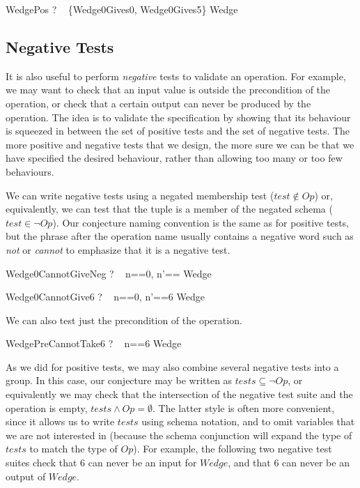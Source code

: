 \documentclass{llncs}
\begin{document}
\begin{theorem}{WedgePos}
  \vdash? ~ \{Wedge0Gives0, Wedge0Gives5\} \subseteq Wedge
\end{theorem}


\subsection{Negative Tests}

It is also useful to perform \emph{negative} tests to validate an
operation.  For example, we may want to check that an input value is
outside the precondition of the operation, or check that a certain output
can never be produced by the operation.  The idea is to validate the
specification by showing that its behaviour is squeezed in between the set
of positive tests and the set of negative tests.  The more positive and
negative tests that we design, the more sure we can be that we have
specified the desired behaviour, rather than allowing too many or too few
behaviours.

We can write negative tests using a negated membership test ($test
\notin Op$) or, equivalently, we can test that the tuple is a member
of the negated schema ($test \in \lnot Op$).  Our conjecture naming
convention is the same as for positive tests, but the phrase after the
operation name usually contains a negative word such as \emph{not} or
\emph{cannot} to emphasize that it is a negative test.

\begin{theorem}{Wedge0CannotGiveNeg}
  \vdash? ~ \lblot n==0, n'== \rblot \notin Wedge
\end{theorem}
\vspace{-5ex}
\begin{theorem}{Wedge0CannotGive6}
  \vdash? ~ \lblot n==0, n'==6 \rblot \in \lnot Wedge
\end{theorem}

We can also test just the precondition of the operation.
\begin{theorem}{WedgePreCannotTake6}
  \vdash? ~ \lblot n==6 \rblot \notin \pre Wedge
\end{theorem}

As we did for positive tests, we may also combine several negative tests
into a group.  In this case, our conjecture may be written as $tests
\subseteq \lnot Op$, or equivalently we may check that the intersection of
the negative test suite and the operation is empty, $tests \land Op =
\emptyset$.  The latter style is often more convenient, since it allows us
to write $tests$ using schema notation, and to omit variables that we are
not interested in (because the schema conjunction will expand the type of
$tests$ to match the type of $Op$).  For example, the following two negative
test suites check that 6 can never be an input for $Wedge$, and that 6 can
never be an output of $Wedge$.
\end{document}
